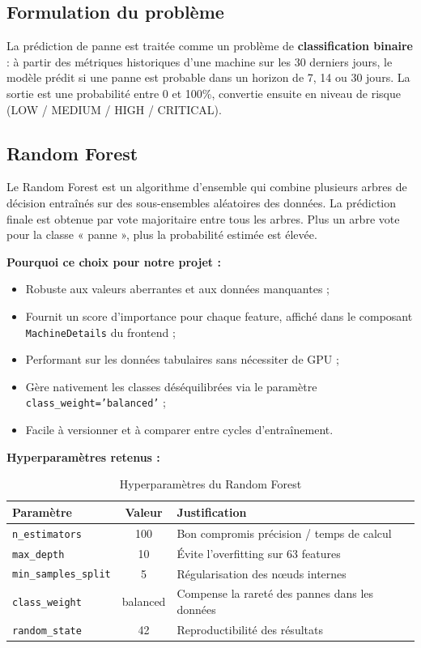 \subsection{Formulation du problème}

La prédiction de panne est traitée comme un problème de \textbf{classification
binaire} : à partir des métriques historiques d'une machine sur les 30 derniers
jours, le modèle prédit si une panne est probable dans un horizon de 7, 14 ou
30 jours. La sortie est une probabilité entre 0 et 100\%, convertie ensuite en
niveau de risque (LOW / MEDIUM / HIGH / CRITICAL).

\subsection{Random Forest}

Le Random Forest \cite{breiman2001rf} est un algorithme d'ensemble qui combine
plusieurs arbres de décision entraînés sur des sous-ensembles aléatoires des
données. La prédiction finale est obtenue par vote majoritaire entre tous les
arbres. Plus un arbre vote pour la classe « panne », plus la probabilité estimée
est élevée.

\textbf{Pourquoi ce choix pour notre projet :}
\begin{itemize}
  \item Robuste aux valeurs aberrantes et aux données manquantes ;
  \item Fournit un score d'importance pour chaque feature, affiché dans le
        composant \texttt{MachineDetails} du frontend ;
  \item Performant sur les données tabulaires sans nécessiter de GPU ;
  \item Gère nativement les classes déséquilibrées via le paramètre
        \texttt{class\_weight='balanced'} ;
  \item Facile à versionner et à comparer entre cycles d'entraînement.
\end{itemize}

\textbf{Hyperparamètres retenus :}
\begin{table}[H]
\centering
\caption{Hyperparamètres du Random Forest}
\begin{tabularx}{\textwidth}{|l|c|X|}
\hline
\rowcolor{lightblue}
\textbf{Paramètre} & \textbf{Valeur} & \textbf{Justification} \\
\hline
\texttt{n\_estimators} & 100 & Bon compromis précision / temps de calcul \\
\hline
\texttt{max\_depth} & 10 & Évite l'overfitting sur 63 features \\
\hline
\texttt{min\_samples\_split} & 5 & Régularisation des nœuds internes \\
\hline
\texttt{class\_weight} & balanced & Compense la rareté des pannes dans les données \\
\hline
\texttt{random\_state} & 42 & Reproductibilité des résultats \\
\hline
\end{tabularx}
\end{table}

